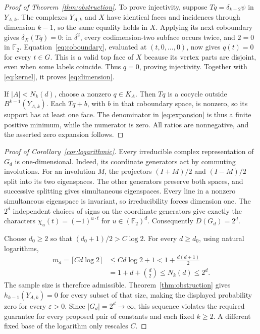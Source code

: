 \documentclass[11pt]{article}
\newcommand{\F}{\mathbb F_2}
\begin{document}
\begin{proof}[Proof of Theorem~\ref{thm:obstruction}]
To prove injectivity, suppose $Tq=\delta_{k-2}\psi$ in $Y_{A,k}$.
The complexes $Y_{A,k}$ and $X$ have identical faces and incidences through
dimension $k-1$, so the same equality holds in $X$.
Applying its next coboundary gives $\delta_X(Tq)=0$:
in $\delta^2$, every codimension-two subface occurs twice, and $2=0$ in
$\F$. Equation~\eqref{eq:coboundary}, evaluated at $(t,0,\ldots,0)$,
now gives $q(t)=0$ for every $t\in G$. This is a valid top face of $X$
because its vertex parts are disjoint, even when some labels coincide.
Thus $q=0$, proving injectivity. Together with \eqref{eq:kernel}, it proves
\eqref{eq:dimension}.

If $|A|<N_k(d)$, choose a nonzero $q\in K_A$.
Then $Tq$ is a cocycle outside $B^{k-1}(Y_{A,k})$.
Each $Tq+b$, with $b$ in that coboundary space, is nonzero, so its support
has at least one face. The denominator in \eqref{eq:expansion} is thus a
finite positive minimum, while the numerator is zero. All ratios are
nonnegative, and the asserted zero expansion follows.
\end{proof}

\begin{proof}[Proof of Corollary~\ref{cor:logarithmic}]
Every irreducible complex representation of $G_d$ is one-dimensional.
Indeed, its coordinate generators act by commuting involutions.
For an involution $M$, the projectors $(I+M)/2$ and $(I-M)/2$ split into
its two eigenspaces. The other generators preserve both spaces, and
successive splitting gives simultaneous eigenspaces. Every line in a
nonzero simultaneous eigenspace is invariant, so irreducibility forces
dimension one. The $2^d$ independent choices of signs on the coordinate
generators give exactly the characters
$\chi_u(t)=(-1)^{u\cdot t}$ for $u\in(\F)^d$. Consequently $D(G_d)=2^d$.

Choose $d_0\ge2$ so that $(d_0+1)/2>C\log2$.
For every $d\ge d_0$, using natural logarithms,
\[
\begin{aligned}
m_d=\lceil C d\log2\rceil
&\le C d\log2+1
<1+\frac{d(d+1)}2\\
&=1+d+\binom d2\le N_k(d)\le2^d.
\end{aligned}
\]
The sample size is therefore admissible. Theorem~\ref{thm:obstruction}
gives $h_{k-1}(Y_{A,k})=0$ for every subset of that size, making the
displayed probability zero for every $\varepsilon>0$.
Since $|G_d|=2^d\to\infty$, this sequence violates the required guarantee
for every proposed pair of constants and each fixed $k\ge2$.
A different fixed base of the logarithm only rescales $C$.
\end{proof}
\end{document}
